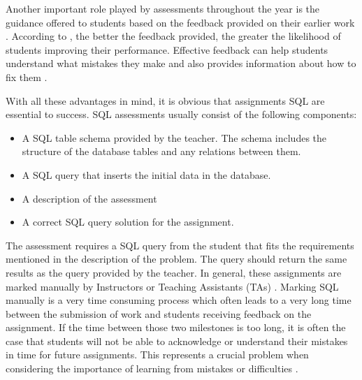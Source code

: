Another important role played by assessments throughout the year is the guidance offered to students based on the feedback provided on their earlier work \citep{literature:assement}. According to \cite{literature:assement}, the better the feedback provided, the greater the likelihood of students improving their performance. Effective feedback can help students understand what mistakes they make and also provides information about how to fix them \citep{literature:assement}.

With all these advantages in mind, it is obvious that assignments SQL are essential to success. SQL assessments usually consist of the following components:
\begin{itemize}
    \item A SQL table schema provided by the teacher. The schema includes
    the structure of the database tables and any relations between them.
    \item A SQL query that inserts the initial data in the database.
    \item A description of the assessment
    \item A correct SQL query solution for the
    assignment.
\end{itemize}

The assessment requires a SQL query from the student that fits the requirements mentioned in the description of the problem. The query should return the same results as the query provided by the teacher. In general, these assignments are marked manually by Instructors or Teaching Assistants (TAs) \citep{literature:xdata}. Marking SQL manually is a very time consuming process which often leads to a very long time between the submission of work and students receiving feedback on the assignment. If the time between those two milestones is too long, it is often the case that students will not be able to acknowledge or understand their mistakes in time for future assignments. This represents a crucial problem when considering the importance of learning from mistakes or difficulties \citep{literature:assement}.

